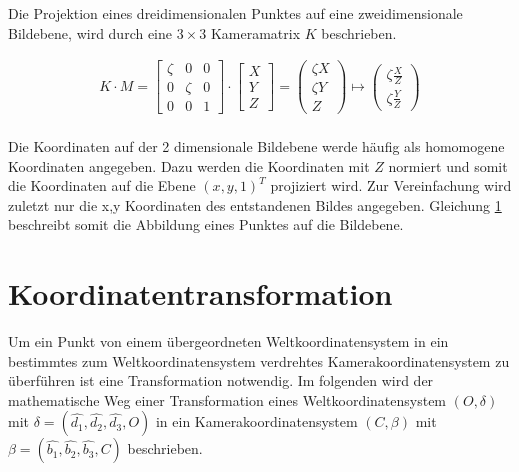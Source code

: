 Die Projektion eines dreidimensionalen Punktes auf eine zweidimensionale Bildebene, wird durch eine $3 \times 3$ Kameramatrix $K$ beschrieben. 

\begin{gather}
	K\cdot M =
	\begin{bmatrix}
		\zeta&0&0\\
		0&\zeta&0\\
		0&0&1
	\end{bmatrix}
	\cdot
	\begin{bmatrix}
		X\\Y\\Z
	\end{bmatrix}
	=
	\begin{pmatrix}
		\zeta X\\ \zeta Y\\ Z
	\end{pmatrix}
	\mapsto
	\begin{pmatrix}
		\zeta \frac{X}{Z}\\ \zeta \frac{Y}{Z}
	\end{pmatrix}
	\label{eq:2.1}
\end{gather}\\

Die Koordinaten auf der 2 dimensionale Bildebene werde häufig als homomogene Koordinaten angegeben. Dazu werden die Koordinaten mit $Z$ normiert und somit die Koordinaten auf die Ebene $(x,y,1)^T$ projiziert wird. Zur Vereinfachung wird zuletzt nur die x,y Koordinaten des entstandenen Bildes angegeben. Gleichung \ref{} beschreibt somit die Abbildung eines Punktes auf die Bildebene.

\section{Koordinatentransformation}

Um ein Punkt von einem übergeordneten Weltkoordinatensystem in ein bestimmtes zum Weltkoordinatensystem verdrehtes Kamerakoordinatensystem zu überführen ist eine Transformation notwendig. Im folgenden wird der mathematische Weg einer Transformation eines Weltkoordinatensystem $(O,\delta)$ mit $\delta = (\hat{d_1},\hat{d_2},\hat{d_3},O)$ in ein Kamerakoordinatensystem $(C,\beta)$ mit $\beta = (\hat{b_1},\hat{b_2},\hat{b_3},C)$ beschrieben.



